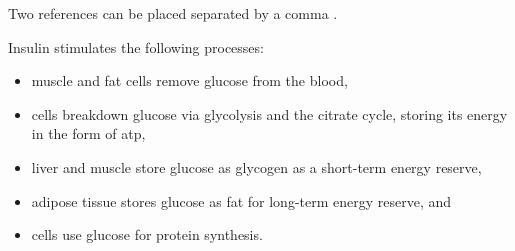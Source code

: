 Two references can be placed separated by a comma \cite{lastname07,name06}.







Insulin stimulates the following processes:

\begin{itemize}
\item muscle and fat cells remove glucose from the blood,
\item cells breakdown glucose via glycolysis and the citrate cycle, storing its energy in the form of \gls{atp},
\item liver and muscle store glucose as glycogen as a short-term energy reserve,
\item adipose tissue stores glucose as fat for long-term energy reserve, and
\item cells use glucose for protein synthesis.
\end{itemize}







